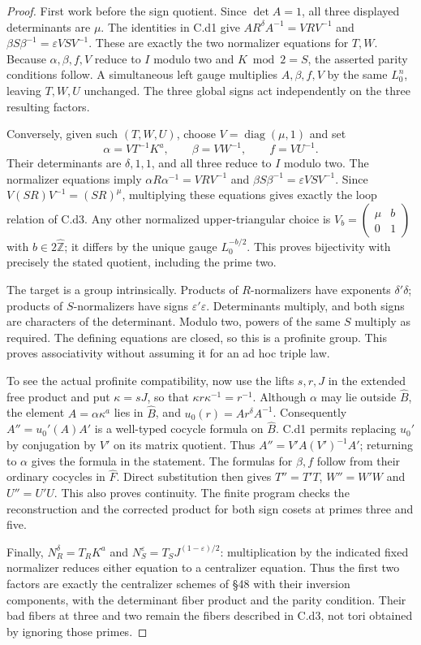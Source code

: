 \begin{proof}
First work before the sign quotient. Since $\det A=1$, all three displayed determinants are $\mu$. The identities in C.d1 give
$A R^\delta A^{-1}=VRV^{-1}$ and
$\beta S\beta^{-1}=\varepsilon VSV^{-1}$.
These are exactly the two normalizer equations for $T,W$. Because $\alpha,\beta,f,V$ reduce to $I$ modulo two and $K\bmod2=S$, the asserted parity conditions follow. A simultaneous left gauge multiplies $A,\beta,f,V$ by the same $L_0^n$, leaving $T,W,U$ unchanged. The three global signs act independently on the three resulting factors.

Conversely, given such $(T,W,U)$, choose $V=\operatorname{diag}(\mu,1)$ and set
\[
 \alpha=VT^{-1}K^a,\qquad \beta=VW^{-1},\qquad f=VU^{-1}.
\]
Their determinants are $\delta,1,1$, and all three reduce to $I$ modulo two. The normalizer equations imply
$\alpha R\alpha^{-1}=VRV^{-1}$ and
$\beta S\beta^{-1}=\varepsilon VSV^{-1}$.
Since $V(SR)V^{-1}=(SR)^\mu$, multiplying these equations gives exactly the loop relation of C.d3. Any other normalized upper-triangular choice is $V_b=\left(\begin{smallmatrix}\mu&b\\0&1\end{smallmatrix}\right)$ with $b\in2\widehat{\mathbb Z}$; it differs by the unique gauge $L_0^{-b/2}$. This proves bijectivity with precisely the stated quotient, including the prime two.

The target is a group intrinsically. Products of $R$-normalizers have exponents $\delta'\delta$; products of $S$-normalizers have signs $\varepsilon'\varepsilon$. Determinants multiply, and both signs are characters of the determinant. Modulo two, powers of the same $S$ multiply as required. The defining equations are closed, so this is a profinite group. This proves associativity without assuming it for an ad hoc triple law.

To see the actual profinite compatibility, now use the lifts $s,r,J$ in the extended free product and put $\kappa=sJ$, so that $\kappa r\kappa^{-1}=r^{-1}$. Although $\alpha$ may lie outside $\widehat B$, the element $A=\alpha\kappa^a$ lies in $\widehat B$, and
$u_0(r)=A r^\delta A^{-1}$. Consequently
$A''=u_0'(A)A'$ is a well-typed cocycle formula on $\widehat B$. C.d1 permits replacing $u_0'$ by conjugation by $V'$ on its matrix quotient. Thus
$A''=V' A(V')^{-1}A'$; returning to $\alpha$ gives the formula in the statement. The formulas for $\beta,f$ follow from their ordinary cocycles in $\widehat F$. Direct substitution then gives $T''=T'T$, $W''=W'W$ and $U''=U'U$. This also proves continuity. The finite program checks the reconstruction and the corrected product for both sign cosets at primes three and five.

Finally, $N_R^\delta=T_RK^a$ and $N_S^\varepsilon=T_SJ^{(1-\varepsilon)/2}$: multiplication by the indicated fixed normalizer reduces either equation to a centralizer equation. Thus the first two factors are exactly the centralizer schemes of \S48 with their inversion components, with the determinant fiber product and the parity condition. Their bad fibers at three and two remain the fibers described in C.d3, not tori obtained by ignoring those primes.
\end{proof}

